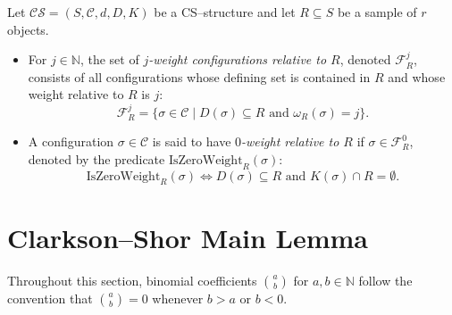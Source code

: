 \begin{definition}
\label{def:j_weight_config}
Let $\mathcal{CS} = (S, \mathcal{C}, d, D, K)$ be a CS--structure and let $R \subseteq S$ be a sample of $r$ objects.
\begin{itemize}
    \item For $j \in \mathbb{N}$, the set of \emph{$j$-weight configurations relative to $R$}, denoted $\mathcal{F}_R^j$, consists of all configurations whose defining set is contained in $R$ and whose weight relative to $R$ is $j$:
    \[
    \mathcal{F}_R^j = \{ \sigma \in \mathcal{C} \mid D(\sigma) \subseteq R \text{ and } \omega_R(\sigma) = j \}.
    \]
    \item A configuration $\sigma \in \mathcal{C}$ is said to have \emph{$0$-weight relative to $R$} if $\sigma \in \mathcal{F}_R^0$, denoted by the predicate $\mathrm{IsZeroWeight}_R(\sigma)$:
    \[
    \mathrm{IsZeroWeight}_R(\sigma) \iff D(\sigma) \subseteq R \text{ and } K(\sigma) \cap R = \emptyset.
    \]
\end{itemize}
\end{definition}

\section{Clarkson--Shor Main Lemma}

Throughout this section, binomial coefficients $\binom{a}{b}$ for $a, b \in \mathbb{N}$ follow the convention that $\binom{a}{b} = 0$ whenever $b > a$ or $b < 0$.

